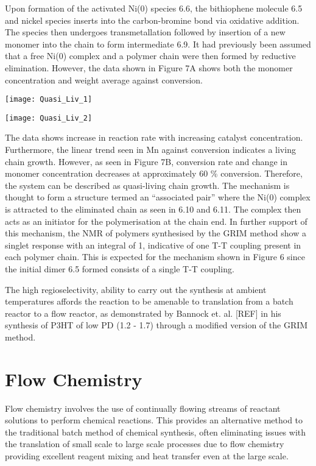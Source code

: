 Upon formation of the activated Ni(0) species 6.6, the bithiophene molecule 6.5 and nickel species inserts into the carbon-bromine bond via oxidative addition. The species then undergoes transmetallation followed by insertion of a new monomer into the chain to form intermediate 6.9. It had previously been assumed that a free Ni(0) complex and a polymer chain were then formed by reductive elimination. However, the data shown in Figure 7A shows both the monomer concentration and weight average against conversion. 

\texttt{[image: Quasi\_Liv\_1]}

\texttt{[image: Quasi\_Liv\_2]}

The data shows increase in reaction rate with increasing catalyst concentration. Furthermore, the linear trend seen in Mn against conversion indicates a living chain growth. However, as seen in Figure 7B, conversion rate and change in monomer concentration decreases at approximately 60 \% conversion. Therefore, the system can be described as quasi-living chain growth. The mechanism is thought to form a structure termed an “associated pair” where the Ni(0) complex is attracted to the eliminated chain as seen in 6.10 and 6.11. The complex then acts as an initiator for the polymerisation at the chain end. In further support of this mechanism, the NMR of polymers synthesised by the GRIM method show a singlet response with an integral of 1, indicative of one T-T coupling present in each polymer chain. This is expected for the mechanism shown in Figure 6 since the initial dimer 6.5 formed consists of a single T-T coupling. 

The high regioselectivity, ability to carry out the synthesis at ambient temperatures affords the reaction to be amenable to translation from a batch reactor to a flow reactor, as demonstrated by Bannock et. al. [REF] in his synthesis of P3HT of low PD (1.2 - 1.7) through a modified version of the GRIM method. 

\section{Flow Chemistry}

Flow chemistry involves the use of continually flowing streams of reactant solutions to perform chemical reactions. This provides an alternative method to the traditional batch method of chemical synthesis, often eliminating issues with the translation of small scale to large scale processes due to flow chemistry providing excellent reagent mixing and heat transfer even at the large scale. 

